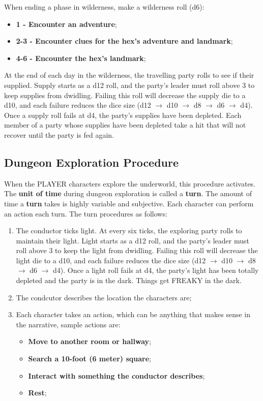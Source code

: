 When ending a phase in wilderness, make a wilderness roll (d6):
\begin{itemize}
    \item {\textbf{1 - Encounter an adventure};}
    \item {\textbf{2-3 - Encounter clues for the hex's adventure and landmark};}
    \item {\textbf{4-6 - Encounter the hex's landmark};}
\end{itemize}
At the end of each day in the wilderness, the travelling party rolls to see if their supplied. Supply starts as a d12 roll, and the party's leader must roll above 3 to keep supplies from dwidling. Failing this roll will decrease the supply die to a d10, and each failure reduces the dice size (d12 $\rightarrow$ d10 $\rightarrow$ d8 $\rightarrow$ d6 $\rightarrow$ d4). Once a supply roll fails at d4, the party's supplies have been depleted. Each member of a party whose supplies have been depleted take a hit that will not recover until the party is fed again.

\subsection{Dungeon Exploration Procedure}
When the PLAYER characters explore the underworld, this procedure activates. The \textbf{unit of time} during dungeon exploration is called a \textbf{turn}. The amount of time a \textbf{turn} takes is highly variable and subjective. Each character can perform an action each turn. The turn procedures as follows:
\begin{enumerate}
    \item {The conductor ticks light. At every six ticks, the exploring party rolls to maintain their light. Light starts as a d12 roll, and the party's leader must roll above 3 to keep the light from dwidling. Failing this roll will decrease the light die to a d10, and each failure reduces the dice size (d12 $\rightarrow$ d10 $\rightarrow$ d8 $\rightarrow$ d6 $\rightarrow$ d4). Once a light roll fails at d4, the party's light has been totally depleted and the party is in the dark. Things get FREAKY in the dark.}
    \item {The condcutor describes the location the characters are;}
    \item {Each character takes an action, which can be anything that makes sense in the narrative, sample actions are:}
    \begin{itemize}
        \item {\textbf{Move to another room or hallway};}
        \item {\textbf{Search a 10-foot (6 meter) square};}
        \item {\textbf{Interact with something the conductor describes};}
        \item {\textbf{Rest};}
    \end{itemize}
\end{enumerate}

